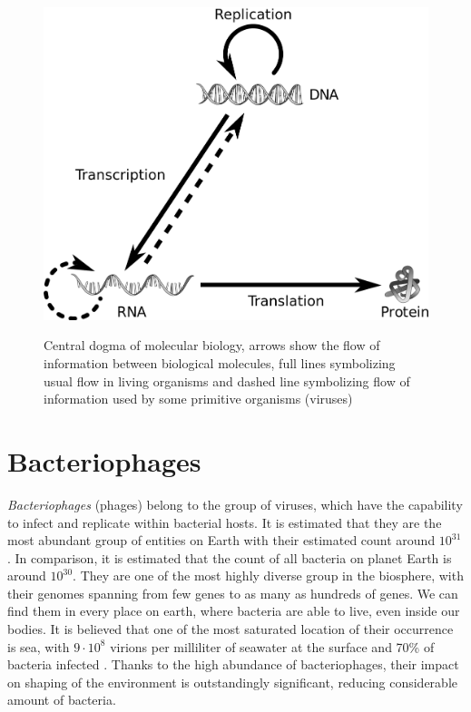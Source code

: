 \begin{figure}[htp]
\includegraphics[width=\linewidth]{./images/central_dogma.png}
\centering
\cite{central_dogma}
\caption[Central dogma of molecular biology]{Central dogma of molecular biology,
arrows show the flow of information between biological molecules, full lines symbolizing usual flow in living organisms and dashed line symbolizing flow of information used by some primitive organisms (viruses)}
\end{figure}

\section{Bacteriophages}
\emph{Bacteriophages} (phages) belong to the group of viruses, which have the capability to infect and replicate within bacterial hosts.
It is estimated that they are the most abundant group of entities on Earth with their estimated count around $10^{31}$\cite{phage}.
In comparison, it is estimated that the count of all bacteria on planet Earth is around $10^{30}$.
They are one of the most highly diverse group in the biosphere, with their genomes spanning from few genes to as many as hundreds of genes.
We can find them in every place on earth, where bacteria are able to live, even inside our bodies.
It is believed that one of the most saturated location of their occurrence is sea, with  $9\cdot 10^8$ virions per milliliter of seawater at the surface and 70\% of bacteria infected \cite{virioplankton}.
Thanks to the high abundance of bacteriophages, their impact on shaping of the environment is outstandingly significant, reducing considerable amount of bacteria.

